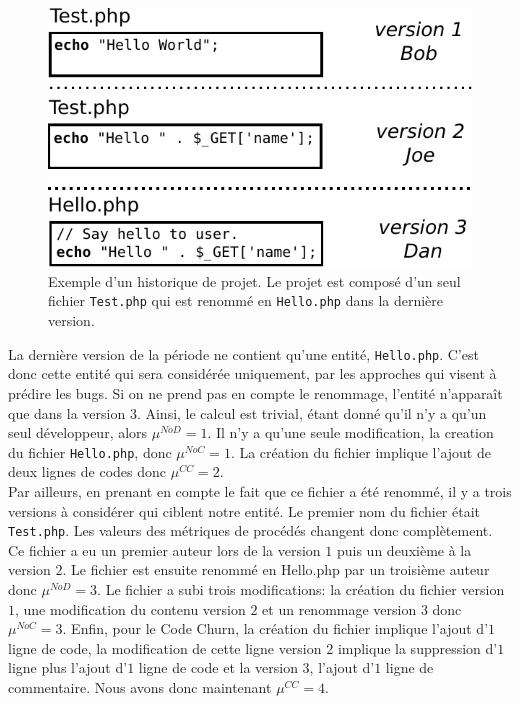\begin{figure}[h]
	\centering
	\includegraphics[width=0.8\linewidth,keepaspectratio]{data/figures/example.pdf}
	\caption{Exemple d'un historique de projet. Le projet est composé d'un seul fichier \texttt{Test.php} qui est renommé en \texttt{Hello.php} dans la dernière version.}
	\label{fig:exemple}
\end{figure}

La dernière version de la période ne contient qu'une entité, \texttt{Hello.php}. C'est donc cette entité qui sera considérée uniquement, par les approches qui visent à prédire les bugs. Si on ne prend pas en compte le renommage, l'entité n'apparaît que dans la version 3. Ainsi, le calcul est trivial, étant donné qu'il n'y a qu'un seul développeur, alors $\mu^{NoD}=1$. Il n'y a qu'une seule modification, la creation du fichier \texttt{Hello.php}, donc $\mu^{NoC}=1$. La création du fichier implique l'ajout de deux lignes de codes donc $\mu^{CC}=2$.\\

Par ailleurs, en prenant en compte le fait que ce fichier a été renommé, il y a trois versions à considérer qui ciblent notre entité. Le premier nom du fichier était \texttt{Test.php}. Les valeurs des métriques de procédés changent donc complètement. Ce fichier a eu un premier auteur lors de la version $1$ puis un deuxième à la version $2$. Le fichier est ensuite renommé en Hello.php par un troisième auteur donc $\mu^{NoD}=3$. Le fichier a subi trois modifications: la création du fichier version $1$, une modification du contenu version $2$ et un renommage version $3$ donc $\mu^{NoC}=3$. Enfin, pour le Code Churn, la création du fichier implique l'ajout d'$1$ ligne de code, la modification de cette ligne version $2$ implique la suppression d'$1$ ligne plus l'ajout d'$1$ ligne de code et la version 3, l'ajout d'$1$ ligne de commentaire. Nous avons donc maintenant $\mu^{CC}=4$. \\

